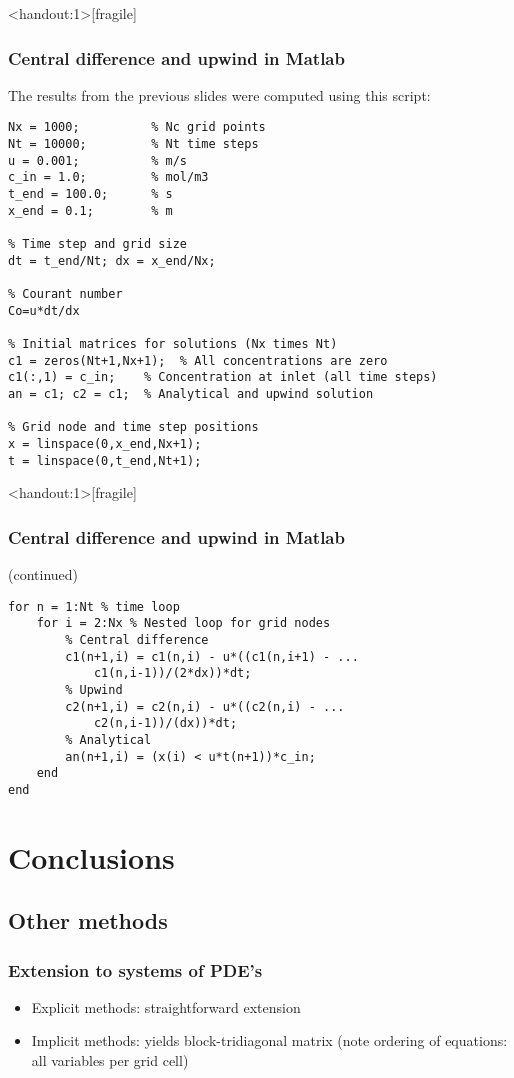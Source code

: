 \documentclass[11pt,table,final,fleqn,xcolor={usenames,dvipsnames,table}]{beamer}
\begin{document}
\begin{frame}<handout:1>[fragile]
  \frametitle{Central difference and upwind in Matlab}
  \footnotesize\selectfont
  The results from the previous slides were computed using this script:
  \begin{lstlisting}[basicstyle=\scriptsize\ttfamily,]
Nx = 1000;          % Nc grid points
Nt = 10000;         % Nt time steps
u = 0.001;          % m/s
c_in = 1.0;         % mol/m3
t_end = 100.0;      % s
x_end = 0.1;        % m

% Time step and grid size
dt = t_end/Nt; dx = x_end/Nx;

% Courant number
Co=u*dt/dx

% Initial matrices for solutions (Nx times Nt)
c1 = zeros(Nt+1,Nx+1);  % All concentrations are zero
c1(:,1) = c_in;    % Concentration at inlet (all time steps)
an = c1; c2 = c1;  % Analytical and upwind solution

% Grid node and time step positions
x = linspace(0,x_end,Nx+1);
t = linspace(0,t_end,Nt+1);
\end{lstlisting}
\end{frame}

\begin{frame}<handout:1>[fragile]
  \frametitle{Central difference and upwind in Matlab}
  \footnotesize\selectfont
  (continued)
\begin{lstlisting}
for n = 1:Nt % time loop
    for i = 2:Nx % Nested loop for grid nodes
        % Central difference
        c1(n+1,i) = c1(n,i) - u*((c1(n,i+1) - ...
            c1(n,i-1))/(2*dx))*dt;
        % Upwind
        c2(n+1,i) = c2(n,i) - u*((c2(n,i) - ...
            c2(n,i-1))/(dx))*dt;
        % Analytical
        an(n+1,i) = (x(i) < u*t(n+1))*c_in;
    end
end
  \end{lstlisting}
\end{frame}

\section{Conclusions}
\subsection{Other methods}
\begin{frame}
  \frametitle{Extension to systems of PDE's}
  \begin{itemize}
    \item Explicit methods: straightforward extension
    \item Implicit methods: yields block-tridiagonal matrix (note ordering of equations: all variables per grid cell)
  \end{itemize}
\end{frame}
\end{document}

